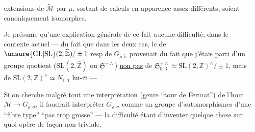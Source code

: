 

extensions de $\widetilde{\mathcal M}$ par $\mu$, sortant de calculs en apparence assez différents, soient canoniquement isomorphes.

Je présume qu'une explication générale de ce fait  aucune difficulté, dans le contexte actuel --- du fait que dans les deux cas, le  de $\unsure{\mathrm{GL}|\mathrm{SL}}(2,\widehat{\mathbb Z})/\pm1$ resp de $G_{\rho,\widetilde\sigma}$ provenait du fait que j'étais parti d'un groupe quotient ($\mathrm{SL}(2,\widehat{\mathbb Z})$ ou $\mathfrak S^{+\wedge}$) \uline{non pas} de $\mathfrak S_{0,3}^{+\wedge}\simeq\mathrm{SL}(2,\mathbb Z)^\wedge/\pm1$, mais de $\mathrm{SL}(2,\mathbb Z)^\wedge\simeq N_{1,1}$ lui-$\overline{\mathrm m}$ ---

Si on cherche malgré tout une interprétation (genre ``tour de Fermat'') de l'hom $\mathcal M\to G_{\rho,\sigma}$, il faudrait interpréter $G_{\rho,\sigma}$  comme un groupe d'automorphismes d'une ``fibre type'' ``pas trop grosse'' --- la difficulté étant d'inventer quelque chose sur quoi  opère de façon non triviale.



